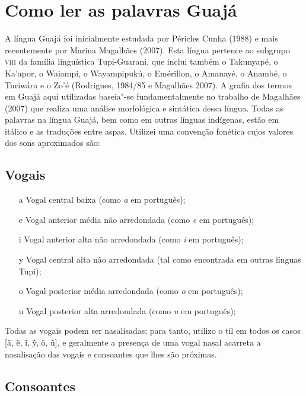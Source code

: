 
\chapter{Como ler as palavras Guajá}


A língua Guajá foi inicialmente estudada por Péricles Cunha (1988) e
mais recentemente por Marina Magalhães (2007). Esta língua pertence ao
subgrupo \textsc{viii} da família linguística Tupi-Guarani, que inclui também o
Takunyapé, o Ka'apor, o Waiampi, o Wayampipukú, o Emérillon, o Amanayé,
o Anambé, o Turiwára e o Zo'é (Rodrigues, 1984/85 e Magalhães 2007). A
grafia dos termos em Guajá aqui utilizadas baseia"-se fundamentalmente no
trabalho de Magalhães (2007) que realiza uma análise morfológica e
sintática dessa língua. Todas as palavras na língua Guajá, bem como em
outras línguas indígenas, estão em itálico e as traduções entre aspas.
Utilizei uma convenção fonética cujos valores dos sons aproximados são:

\section{Vogais}

\begin{itemize}
\item[a] Vogal central baixa (como \emph{a} em português);

\item[e] Vogal anterior média não arredondada (como \emph{e} em português);

\item[i] Vogal anterior alta não arredondada (como \emph{i} em português);

\item[y] Vogal central alta não arredondada (tal como encontrada em outras línguas Tupi);

\item[o] Vogal posterior média arredondada (como \emph{o} em português);

\item[u] Vogal posterior alta arredondada (como \emph{u} em português);
\end{itemize} 


Todas as vogais podem ser nasalisadas; para tanto, utilizo o til em
todos os casos {[}ã, ẽ, ĩ, ỹ, õ, ũ{]}, e geralmente a presença de uma
vogal nasal acarreta a nasalisação das vogais e consoantes que lhes são
próximas.

\section{Consoantes}

